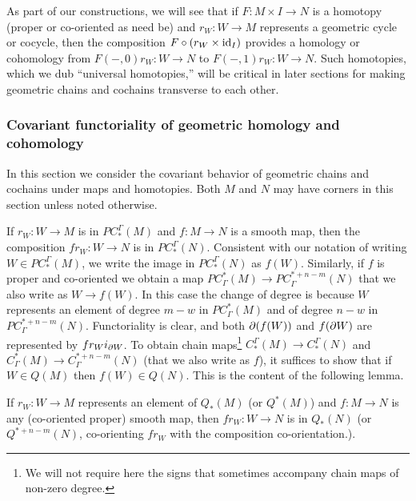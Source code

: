 As part of our constructions, we will see that if $F \colon M \times I \to N$ is a homotopy (proper or co-oriented as need be) and $r_W \colon W \to M$ represents a geometric cycle or cocycle, then the composition $F \circ (r_W \times \mathrm{id}_I)$ provides a homology or cohomology from $F(-,0)r_W \colon W \to N$ to $F(-,1)r_W \colon W \to N$.
Such homotopies, which we dub ``universal homotopies,'' will be critical in later sections for making geometric chains and cochains transverse to each other.


\subsubsection{Covariant functoriality of geometric homology and cohomology}\label{S: covariant functoriality}

In this section we consider the covariant behavior of geometric chains and cochains under maps and homotopies.
Both $M$ and $N$ may have corners in this section unless noted otherwise.

If $r_W \colon W \to M$ is in $PC_*^\Gamma(M)$ and $f \colon M \to N$ is a smooth map, then the composition $fr_W \colon W \to N$ is in $PC^\Gamma_*(N)$.
Consistent with our notation of writing $W \in PC_*^\Gamma(M)$, we write the image in $PC_*^\Gamma(N)$ as $f(W)$.
Similarly, if $f$ is proper and co-oriented we obtain a map $PC^*_\Gamma(M) \to PC^{*+n-m}_\Gamma(N)$ that we also write as $W \to f(W)$.
In this case the change of degree is because $W$ represents an element of degree $m-w$ in $PC^*_\Gamma(M)$ and of degree $n-w$ in $PC^{*+n-m}_\Gamma(N)$.
Functoriality is clear, and both $\partial(f(W))$ and $f(\partial W)$ are represented by $fr_Wi_{\partial W}$.
To obtain chain maps\footnote{We will not require here the signs that sometimes accompany chain maps of non-zero degree.} $C_*^\Gamma(M) \to C_*^\Gamma(N)$ and $C^*_\Gamma(M) \to C^{*+n-m}_\Gamma(N)$
(that we also write as $f$), it suffices to show that if $W \in Q(M)$ then $f(W) \in Q(N)$.
This is the content of the following lemma.

\begin{lemma}\label{L: Q preservation}
	If $r_W \colon W \to M$ represents an element of $Q_*(M)$ (or $Q^*(M)$) and $f \colon M \to N$ is any (co-oriented proper) smooth map, then $fr_W \colon W \to N$ is in $Q_*(N)$ (or $Q^{*+n-m}(N)$, co-orienting $fr_W$ with the composition co-orientation.).
\end{lemma}

